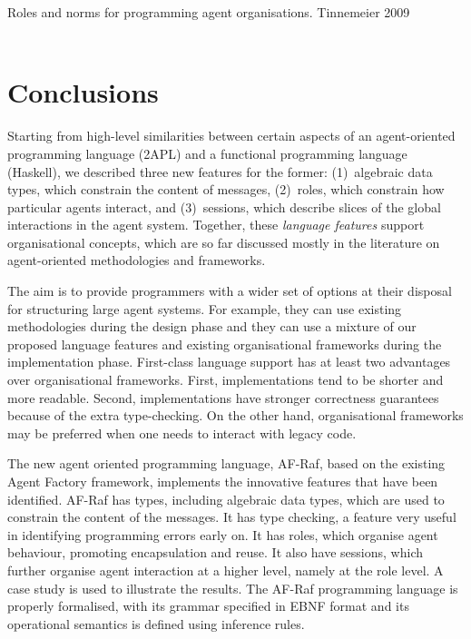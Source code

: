 \documentclass[a4paper,12pt,oneside,fleqn]{book} %
\begin{document}
Roles and norms for programming agent organisations. Tinnemeier 2009
\\~\\


\chapter{Conclusions}\label{ch:conc} %

Starting from high-level similarities between certain aspects of an
agent-oriented programming language (2APL) and a functional programming
language (Haskell), we described three new features for the former:
(1)~algebraic data types, which constrain the content of messages,
(2)~roles, which constrain how particular agents interact, and
(3)~sessions, which describe slices of the global interactions in the agent
system. Together, these \emph{language features} support organisational
concepts, which are so far discussed mostly in the literature on
agent-oriented methodologies and frameworks.

The aim is to provide programmers with a wider set of options at their disposal
for structuring large agent systems. For example, they can use existing
methodologies during the design phase and they can use a mixture of our
proposed language features and existing organisational frameworks during the
implementation phase. First-class language support has at least two
advantages over organisational frameworks. First, implementations tend to be
shorter and more readable. Second, implementations have stronger correctness
guarantees because of the extra type-checking. On the other hand,
organisational frameworks may be preferred when one needs to interact with
legacy code.

The new agent oriented programming language, AF-Raf, based on the existing
Agent Factory framework, implements the innovative features that have been
identified. AF-Raf has types, including algebraic data types, which are
used to constrain the content of the messages. It has type checking, a
feature very useful in identifying programming errors early on. It has
roles, which organise agent behaviour, promoting encapsulation and reuse.
It also have sessions, which further organise agent interaction at a higher
level, namely at the role level. A case study is used to illustrate the
results.  The AF-Raf programming language is properly formalised, with its
grammar specified in EBNF format and its operational semantics is defined
using inference rules.



\appendix
\end{document}
